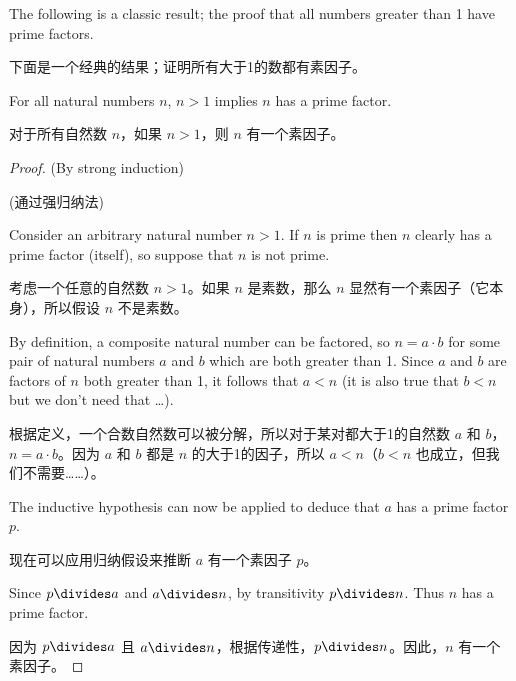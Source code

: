 The following is a classic result; the proof that all numbers
greater than 1 have prime factors.

下面是一个经典的结果；证明所有大于1的数都有素因子。

\begin{thm} For all natural numbers $n$, $n > 1$ implies $n$ has a prime 
factor.

对于所有自然数 $n$，如果 $n > 1$，则 $n$ 有一个素因子。
\end{thm}

\begin{proof} (By strong induction)

(通过强归纳法)

Consider an arbitrary natural number $n>1$.  If $n$ is prime then $n$ clearly
has a prime factor (itself), so suppose that $n$ is not prime.

考虑一个任意的自然数 $n>1$。如果 $n$ 是素数，那么 $n$ 显然有一个素因子（它本身），所以假设 $n$ 不是素数。

By 
definition, a composite
natural number can be factored, so $n=a \cdot b$ for some pair of natural
numbers $a$ and $b$ which are both greater than 1.  Since $a$ and $b$ are  
factors of $n$ both greater than 1, it follows that $a < n$ (it is also 
true that $b < n$ but we don't need that \ldots).

根据定义，一个合数自然数可以被分解，所以对于某对都大于1的自然数 $a$ 和 $b$，$n=a \cdot b$。因为 $a$ 和 $b$ 都是 $n$ 的大于1的因子，所以 $a < n$（$b < n$ 也成立，但我们不需要……）。

The inductive hypothesis
can now be applied to deduce that $a$ has a prime factor $p$.

现在可以应用归纳假设来推断 $a$ 有一个素因子 $p$。

Since
$p \divides a$ and $a \divides n$, by transitivity $p \divides n$.  Thus
$n$ has a prime factor.

因为 $p \divides a$ 且 $a \divides n$，根据传递性，$p \divides n$。因此，$n$ 有一个素因子。
\end{proof}
  

\newpage





